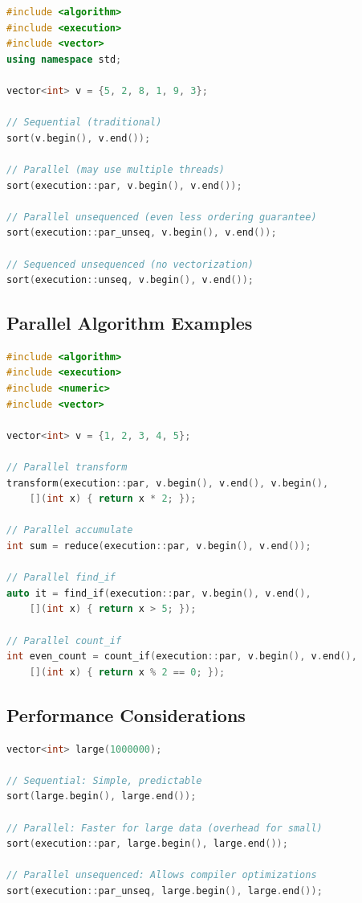 \begin{lstlisting}[language={C++}]
#include <algorithm>
#include <execution>
#include <vector>
using namespace std;

vector<int> v = {5, 2, 8, 1, 9, 3};

// Sequential (traditional)
sort(v.begin(), v.end());

// Parallel (may use multiple threads)
sort(execution::par, v.begin(), v.end());

// Parallel unsequenced (even less ordering guarantee)
sort(execution::par_unseq, v.begin(), v.end());

// Sequenced unsequenced (no vectorization)
sort(execution::unseq, v.begin(), v.end());
\end{lstlisting}

\hypertarget{parallel-algorithm-examples}{%
\subsection{Parallel Algorithm
Examples}\label{parallel-algorithm-examples}}

\begin{lstlisting}[language={C++}]
#include <algorithm>
#include <execution>
#include <numeric>
#include <vector>

vector<int> v = {1, 2, 3, 4, 5};

// Parallel transform
transform(execution::par, v.begin(), v.end(), v.begin(),
    [](int x) { return x * 2; });

// Parallel accumulate
int sum = reduce(execution::par, v.begin(), v.end());

// Parallel find_if
auto it = find_if(execution::par, v.begin(), v.end(),
    [](int x) { return x > 5; });

// Parallel count_if
int even_count = count_if(execution::par, v.begin(), v.end(),
    [](int x) { return x % 2 == 0; });
\end{lstlisting}

\hypertarget{performance-considerations}{%
\subsection{Performance
Considerations}\label{performance-considerations}}

\begin{lstlisting}[language={C++}]
vector<int> large(1000000);

// Sequential: Simple, predictable
sort(large.begin(), large.end());

// Parallel: Faster for large data (overhead for small)
sort(execution::par, large.begin(), large.end());

// Parallel unsequenced: Allows compiler optimizations
sort(execution::par_unseq, large.begin(), large.end());
\end{lstlisting}

